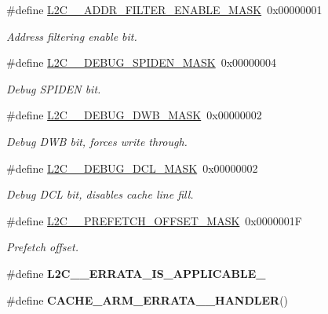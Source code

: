 \begin{DoxyCompactItemize}
$$\#define \mbox{\hyperlink{group__L2C-310__cache_gabb7be6d4d66e161d88595dbbfb1dff64}{L2\+C\+\_\+\_\+\+A\+D\+D\+R\+\_\+\+F\+I\+L\+T\+E\+R\+\_\+\+E\+N\+A\+B\+L\+E\+\_\+\+M\+A\+SK}}~0x00000001
\begin{DoxyCompactList}\small\item\em Address filtering enable bit. \end{DoxyCompactList}\item 
\mbox{\label{group__L2C-310__cache_gaa5611ad435d596dfe594217170618c7c}} 
\#define \mbox{\hyperlink{group__L2C-310__cache_gaa5611ad435d596dfe594217170618c7c}{L2\+C\+\_\+\_\+\+D\+E\+B\+U\+G\+\_\+\+S\+P\+I\+D\+E\+N\+\_\+\+M\+A\+SK}}~0x00000004
\begin{DoxyCompactList}\small\item\em Debug S\+P\+I\+D\+EN bit. \end{DoxyCompactList}\item 
\mbox{\label{group__L2C-310__cache_gaf6bf6baaa525d715571ce01b09e72a2e}} 
\#define \mbox{\hyperlink{group__L2C-310__cache_gaf6bf6baaa525d715571ce01b09e72a2e}{L2\+C\+\_\+\_\+\+D\+E\+B\+U\+G\+\_\+\+D\+W\+B\+\_\+\+M\+A\+SK}}~0x00000002
\begin{DoxyCompactList}\small\item\em Debug D\+WB bit, forces write through. \end{DoxyCompactList}\item 
\mbox{\label{group__L2C-310__cache_gab11eb2570661d9bcf1ec91011992a2e9}} 
\#define \mbox{\hyperlink{group__L2C-310__cache_gab11eb2570661d9bcf1ec91011992a2e9}{L2\+C\+\_\+\_\+\+D\+E\+B\+U\+G\+\_\+\+D\+C\+L\+\_\+\+M\+A\+SK}}~0x00000002
\begin{DoxyCompactList}\small\item\em Debug D\+CL bit, disables cache line fill. \end{DoxyCompactList}\item 
\mbox{\label{group__L2C-310__cache_ga0634fd66abc1384ae2714e6b275d34bb}} 
\#define \mbox{\hyperlink{group__L2C-310__cache_ga0634fd66abc1384ae2714e6b275d34bb}{L2\+C\+\_\+\_\+\+P\+R\+E\+F\+E\+T\+C\+H\+\_\+\+O\+F\+F\+S\+E\+T\+\_\+\+M\+A\+SK}}~0x0000001F
\begin{DoxyCompactList}\small\item\em Prefetch offset. \end{DoxyCompactList}\item 
\mbox{\label{group__L2C-310__cache_gad08de281618f9f934b971682c4f4972a}} 
\#define {\bfseries L2\+C\+\_\+\_\+\+E\+R\+R\+A\+T\+A\+\_\+\+I\+S\+\_\+\+A\+P\+P\+L\+I\+C\+A\+B\+L\+E\+\_}
\item 
\#define {\bfseries C\+A\+C\+H\+E\+\_\+\+A\+R\+M\+\_\+\+E\+R\+R\+A\+T\+A\+\_\+\_\+\+H\+A\+N\+D\+L\+ER}()
\end{DoxyCompactItemize}
